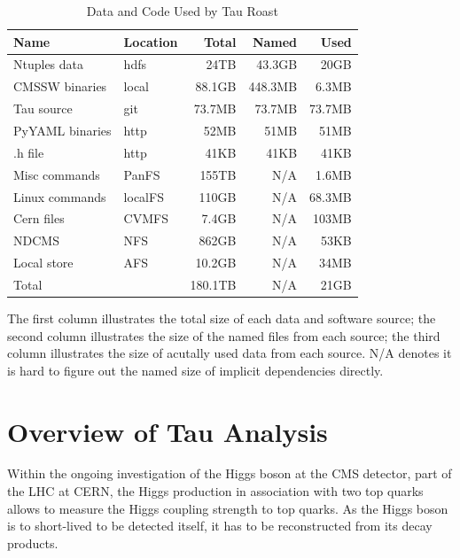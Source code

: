 \documentclass{acm_proc_article-sp}
\begin{document}
\begin{table}[t]
    \centering
    \small
    \begin{tabular}{|l|l|r|r|r|}
        \hline
        \bf Name & \bf Location & \bf Total & \bf Named & \bf Used \\ 
        \hline
        Ntuples data    & hdfs & 24TB & 43.3GB & 20GB \\ \hline
        CMSSW binaries     & local & 88.1GB & 448.3MB & 6.3MB\\ \hline
        Tau source       & git & 73.7MB & 73.7MB & 73.7MB \\ \hline
        PyYAML binaries    & http & 52MB & 51MB & 51MB \\ \hline
        .h file       & http & 41KB & 41KB & 41KB \\ \hline
        Misc commands & PanFS & 155TB & N/A  & 1.6MB \\ \hline
        Linux commands & localFS & 110GB &  N/A & 68.3MB \\ \hline     
        Cern files & CVMFS & 7.4GB & N/A & 103MB \\ \hline
        NDCMS & NFS & 862GB & N/A & 53KB \\ \hline
        Local store & AFS &10.2GB & N/A & 34MB\\ \hline
        Total      &    & 180.1TB            & N/A & 21GB \\ \hline
    \end{tabular}
    \begin{tablenotes}
      \small
      \item The first column illustrates the total size of each data and software source; 
            the second column illustrates the size of the named files from each source;
            the third column illustrates the size of acutally used data from each source.
            N/A denotes it is hard to figure out the named size of implicit dependencies directly.        
    \end{tablenotes}
    \caption{Data and Code Used by Tau Roast}
    \label{table:size-original-real}
\end{table}

\section{Overview of Tau Analysis}

Within the ongoing investigation of the Higgs boson at the CMS
detector, part of the LHC at CERN, the Higgs production in association
with two top quarks allows to measure the Higgs coupling strength to
top quarks.  As the Higgs boson is to short-lived to be detected
itself, it has to be reconstructed from its decay products.
\end{document}

